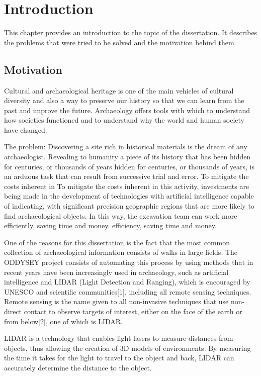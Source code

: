 

\chapter{Introduction}
\label{chapter:introduction}

This chapter provides an introduction to the topic of the dissertation. It describes the problems that were tried to be solved and the motivation behind them.
\section{Motivation}
\cite{https://doi.org/10.48550/arxiv.2103.00020} Cultural and archaeological heritage is one of the main vehicles of cultural diversity and also a way to preserve our history so that we can learn from the past and improve the future. Archaeology offers tools with which to understand how societies functioned and to understand why the world and human society have changed.

The problem: 
Discovering a site rich in historical materials is the dream of any archaeologist. Revealing to humanity a piece of its history that has been hidden for centuries, or thousands of years
hidden for centuries, or thousands of years, is an arduous task that can result from successive trial and error. To mitigate the costs inherent in 
To mitigate the costs inherent in this activity, investments are being made in the development of technologies with artificial intelligence capable of indicating, with significant precision
geographic regions that are more likely to find archaeological objects. In this way, the excavation team can work more efficiently, saving time and money.
efficiency, saving time and money.

One of the reasons for this dissertation is the fact that the most common collection of archaeological information consists of walks in large fields. The ODDYSEY project consists of automating this process by using methods that in recent years have been increasingly used in archaeology, such as artificial intelligence and LIDAR (Light Detection and Ranging), which is encouraged by UNESCO and scientific communities[1], including all remote sensing techniques.
Remote sensing is the name given to all non-invasive techniques that use non-direct contact to observe targets of interest, either on the face of the earth or from below[2], one of which is LIDAR.

LIDAR is a technology that enables light lasers to measure distances from objects, thus allowing the creation of 3D models of environments. By measuring the time it takes for the light to travel to the object and back, LIDAR can accurately determine the distance to the object.

